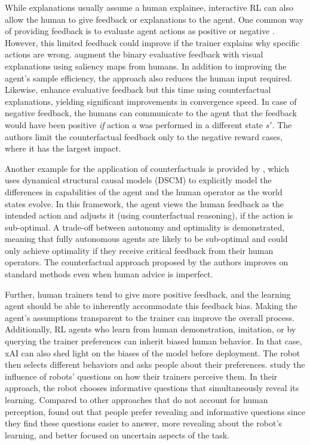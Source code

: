 \documentclass[twoside,11pt]{article}
\begin{document}
While explanations usually assume a human explainee, interactive RL can also allow the human to give feedback or explanations to the agent. One common way of providing feedback is to evaluate agent actions as positive or negative \citep{arakawa:18,Knox:2008:TAMER,knox:13,macglashan2017interactive}. However, this limited feedback could improve if the trainer explains why specific actions are wrong. \citet{guan2020explanation} augment the binary evaluative feedback with visual explanations using saliency maps from humans. In addition to improving the agent's sample efficiency, the approach also reduces the human input required.  Likewise, \citet{Karalus:2021:HITL-counterfactuals} enhance evaluative feedback but this time using counterfactual explanations, yielding significant improvements in convergence speed. In case of negative feedback, the humans can communicate to the agent that the feedback would have been positive \emph{if} action $a$ was performed in a different state $s'$. The authors limit the counterfactual feedback only to the negative reward cases, where it has the largest impact. 

Another example for the application of counterfactuals is provided by \citet{Pearl:2009:Causality}, which uses dynamical structural causal models (DSCM) to explicitly model the differences in capabilities of the agent and the human operator as the world states evolve. In this framework, the agent views the human feedback as the intended action and adjusts it (using counterfactual reasoning), if the action is sub-optimal. A trade-off between autonomy and optimality is demonstrated, meaning that fully autonomous agents are likely to be sub-optimal and could only achieve optimality if they receive critical feedback from their human operators. The counterfactual approach proposed by the authors improves on standard methods even when human advice is imperfect.

Further, human trainers tend to give more positive feedback, and the learning agent should be able to inherently accommodate this feedback bias. Making the agent's assumptions transparent to the trainer can improve the overall process. Additionally, RL agents who learn from human demonstration, imitation, or by querying the trainer preferences can inherit biased human behavior. In that case, xAI can also shed light on the biases of the model before deployment. The robot then selects different behaviors and asks people about their preferences. \citet{habibian:21} study the influence of robots' questions on how their trainers perceive them. In their approach, the robot chooses informative questions that simultaneously reveal its learning. Compared to other approaches that do not account for human perception, \citet{habibian:21} found out that people prefer revealing and informative questions since they find these questions easier to answer, more revealing about the robot's learning, and better focused on uncertain aspects of the task. 
\end{document}
